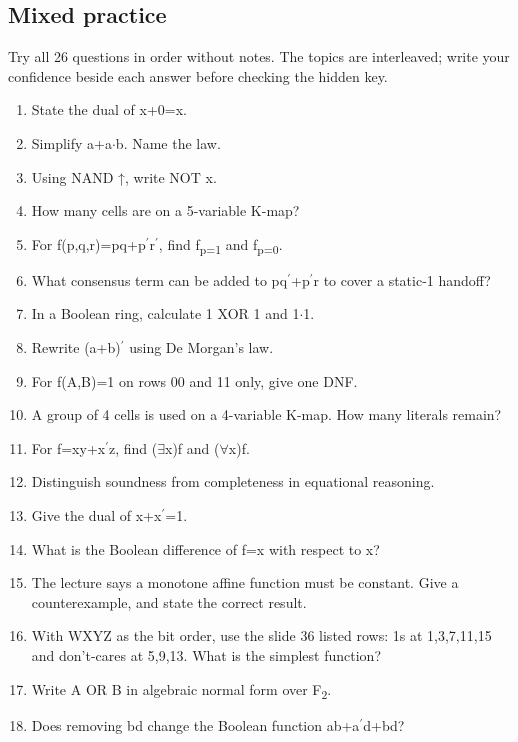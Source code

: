 \documentclass[11pt]{article}
\begin{document}
\begin{keepsection}
\section{Mixed practice}

Try all 26 questions in order without notes. The topics are interleaved; write your confidence beside each answer before checking the hidden key.

\begin{enumerate}
\item State the dual of x+0=x.
\item Simplify a+a\ensuremath{\cdot}b. Name the law.
\item Using NAND ↑, write NOT x.
\item How many cells are on a 5-variable K-map?
\item For f(p,q,r)=pq+p\ensuremath{{}^{\prime}}r\ensuremath{{}^{\prime}}, find f\textsubscript{p=1} and f\textsubscript{p=0}.
\item What consensus term can be added to pq\ensuremath{{}^{\prime}}+p\ensuremath{{}^{\prime}}r to cover a static-1 handoff?
\item In a Boolean ring, calculate 1 XOR 1 and 1\ensuremath{\cdot}1.
\item Rewrite (a+b)\ensuremath{{}^{\prime}} using De Morgan’s law.
\item For f(A,B)=1 on rows 00 and 11 only, give one DNF.
\item A group of 4 cells is used on a 4-variable K-map. How many literals remain?
\item For f=xy+x\ensuremath{{}^{\prime}}z, find (\ensuremath{\exists}x)f and (\ensuremath{\forall}x)f.
\item Distinguish soundness from completeness in equational reasoning.
\item Give the dual of x+x\ensuremath{{}^{\prime}}=1.
\item What is the Boolean difference of f=x with respect to x?
\item The lecture says a monotone affine function must be constant. Give a counterexample, and state the correct result.
\item With WXYZ as the bit order, use the slide 36 listed rows: 1s at 1,3,7,11,15 and don’t-cares at 5,9,13. What is the simplest function?
\item Write A OR B in algebraic normal form over F\textsubscript{2}.
\item Does removing bd change the Boolean function ab+a\ensuremath{{}^{\prime}}d+bd?

\end{enumerate}
\end{keepsection}
\end{document}
